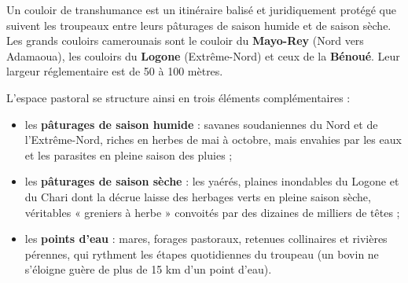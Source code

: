 \documentclass[11pt]{article}
\newcommand{\cle}[1]{{\popxbold\color{popdark}#1}}
\begin{document}
\begin{definition}
Un \cle{couloir de transhumance} est un itinéraire balisé et juridiquement protégé que suivent les troupeaux entre leurs pâturages de saison humide et de saison sèche. Les grands couloirs camerounais sont le couloir du \textbf{Mayo-Rey} (Nord vers Adamaoua), les couloirs du \textbf{Logone} (Extrême-Nord) et ceux de la \textbf{Bénoué}. Leur largeur réglementaire est de 50 à 100 mètres.
\end{definition}

L'espace pastoral se structure ainsi en trois éléments complémentaires :
\begin{itemize}
\item les \textbf{pâturages de saison humide} : savanes soudaniennes du Nord et de l'Extrême-Nord, riches en herbes de mai à octobre, mais envahies par les eaux et les parasites en pleine saison des pluies ;
\item les \textbf{pâturages de saison sèche} : les \cle{yaérés}, plaines inondables du Logone et du Chari dont la décrue laisse des herbages verts en pleine saison sèche, véritables « greniers à herbe » convoités par des dizaines de milliers de têtes ;
\item les \textbf{points d'eau} : mares, forages pastoraux, retenues collinaires et rivières pérennes, qui rythment les étapes quotidiennes du troupeau (un bovin ne s'éloigne guère de plus de 15 km d'un point d'eau).
\end{itemize}
\end{document}
